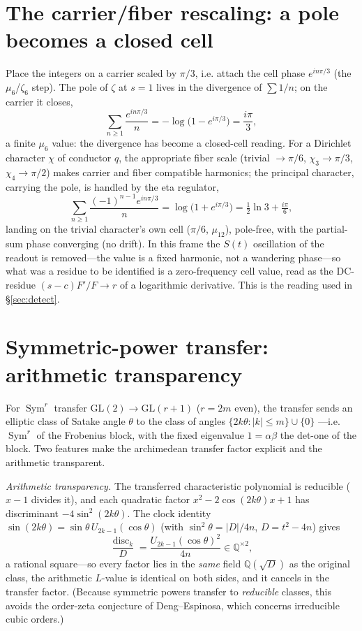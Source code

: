 \documentclass[11pt]{article}
\theoremstyle{definition}
\newcommand{\Sym}{\operatorname{Sym}}
\begin{document}
\section{The carrier/fiber rescaling: a pole becomes a closed cell}\label{sec:carrier}

Place the integers on a carrier scaled by $\pi/3$, i.e. attach the cell phase $e^{in\pi/3}$ (the
$\mu_6$/$\zeta_6$ step). The pole of $\zeta$ at $s=1$ lives in the divergence of $\sum 1/n$; on the
carrier it closes,
\[
  \sum_{n\ge1}\frac{e^{in\pi/3}}{n}=-\log\!\big(1-e^{i\pi/3}\big)=\frac{i\pi}{3},
\]
a finite $\mu_6$ value: the divergence has become a closed-cell reading. For a Dirichlet character
$\chi$ of conductor $q$, the appropriate fiber scale (trivial $\to\pi/6$, $\chi_3\to\pi/3$,
$\chi_4\to\pi/2$) makes carrier and fiber compatible harmonics; the principal character, carrying the
pole, is handled by the eta regulator,
\[
  \sum_{n\ge1}\frac{(-1)^{n-1}e^{in\pi/3}}{n}=\log\!\big(1+e^{i\pi/3}\big)=\tfrac12\ln3+\tfrac{i\pi}{6},
\]
landing on the trivial character's own cell ($\pi/6$, $\mu_{12}$), pole-free, with the partial-sum
phase converging (no drift). In this frame the $S(t)$ oscillation of the readout is removed---the
value is a fixed harmonic, not a wandering phase---so what was a residue to be identified is a
zero-frequency cell value, read as the DC-residue $(s-c)F'/F\to r$ of a logarithmic derivative. This
is the reading used in \S\ref{sec:detect}.

\section{Symmetric-power transfer: arithmetic transparency}\label{sec:fl}

For $\Sym^r$ transfer $\mathrm{GL}(2)\to\mathrm{GL}(r+1)$ ($r=2m$ even), the transfer sends an
elliptic class of Satake angle $\theta$ to the class of angles $\{2k\theta:|k|\le m\}\cup\{0\}$
---i.e. $\Sym^r$ of the Frobenius block, with the fixed eigenvalue $1=\alpha\beta$ the det-one of
the block. Two features make the archimedean transfer factor explicit and the arithmetic transparent.

\emph{Arithmetic transparency.} The transferred characteristic polynomial is reducible ($x-1$
divides it), and each quadratic factor $x^2-2\cos(2k\theta)x+1$ has discriminant $-4\sin^2(2k\theta)$.
The clock identity $\sin(2k\theta)=\sin\theta\,U_{2k-1}(\cos\theta)$ (with $\sin^2\theta=|D|/4n$,
$D=t^2-4n$) gives
\[
  \frac{\operatorname{disc}_k}{D}=\frac{U_{2k-1}(\cos\theta)^2}{4n}\in\mathbb Q^{\times2},
\]
a rational square---so every factor lies in the \emph{same} field $\mathbb Q(\sqrt D)$ as the
original class, the arithmetic $L$-value is identical on both sides, and it cancels in the transfer
factor. (Because symmetric powers transfer to \emph{reducible} classes, this avoids the order-zeta
conjecture of Deng--Espinosa, which concerns irreducible cubic orders.)
\end{document}
